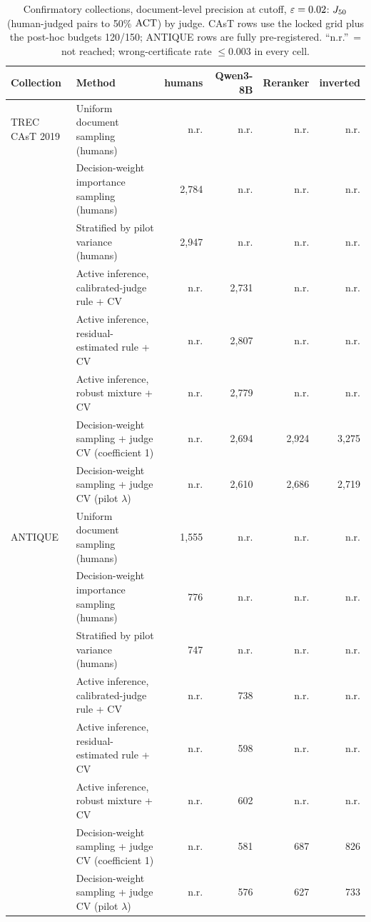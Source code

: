 \begin{table}[t]\centering\small
\caption{Confirmatory collections, document-level precision at cutoff, $\varepsilon=0.02$: $J_{50}$ (human-judged pairs to 50\% $\mathrm{ACT}$) by judge. CAsT rows use the locked grid plus the post-hoc budgets 120/150; ANTIQUE rows are fully pre-registered. ``n.r.''\ = not reached; wrong-certificate rate $\le0.003$ in every cell.}\label{tab:conf}
\begin{tabular}{llrrrr}\toprule
Collection & Method & humans & Qwen3-8B & Reranker & inverted\\\midrule
TREC CAsT 2019 & Uniform document sampling (humans) & n.r. & n.r. & n.r. & n.r.\\
 & Decision-weight importance sampling (humans) & 2,784 & n.r. & n.r. & n.r.\\
 & Stratified by pilot variance (humans) & 2,947 & n.r. & n.r. & n.r.\\
 & Active inference, calibrated-judge rule + CV & n.r. & 2,731 & n.r. & n.r.\\
 & Active inference, residual-estimated rule + CV & n.r. & 2,807 & n.r. & n.r.\\
 & Active inference, robust mixture + CV & n.r. & 2,779 & n.r. & n.r.\\
 & Decision-weight sampling + judge CV (coefficient 1) & n.r. & 2,694 & 2,924 & 3,275\\
 & Decision-weight sampling + judge CV (pilot $\lambda$) & n.r. & 2,610 & 2,686 & 2,719\\
\midrule
ANTIQUE & Uniform document sampling (humans) & 1,555 & n.r. & n.r. & n.r.\\
 & Decision-weight importance sampling (humans) & 776 & n.r. & n.r. & n.r.\\
 & Stratified by pilot variance (humans) & 747 & n.r. & n.r. & n.r.\\
 & Active inference, calibrated-judge rule + CV & n.r. & 738 & n.r. & n.r.\\
 & Active inference, residual-estimated rule + CV & n.r. & 598 & n.r. & n.r.\\
 & Active inference, robust mixture + CV & n.r. & 602 & n.r. & n.r.\\
 & Decision-weight sampling + judge CV (coefficient 1) & n.r. & 581 & 687 & 826\\
 & Decision-weight sampling + judge CV (pilot $\lambda$) & n.r. & 576 & 627 & 733\\
\bottomrule
\end{tabular}
\end{table}